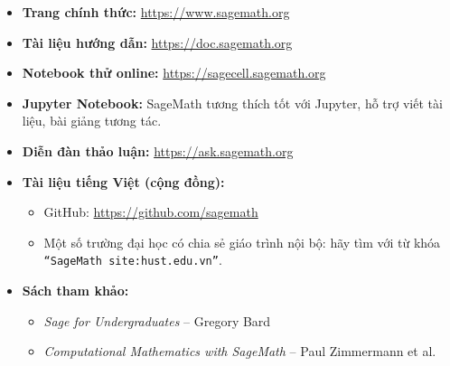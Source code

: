 \begin{itemize}
	\item \textbf{Trang chính thức:} \url{https://www.sagemath.org}
	\item \textbf{Tài liệu hướng dẫn:} \url{https://doc.sagemath.org}
	\item \textbf{Notebook thử online:} \url{https://sagecell.sagemath.org}
	\item \textbf{Jupyter Notebook:} SageMath tương thích tốt với Jupyter, hỗ trợ viết tài liệu, bài giảng tương tác.
	\item \textbf{Diễn đàn thảo luận:} \url{https://ask.sagemath.org}
	\item \textbf{Tài liệu tiếng Việt (cộng đồng):}
	\begin{itemize}
		\item GitHub: \url{https://github.com/sagemath}
		\item Một số trường đại học có chia sẻ giáo trình nội bộ: hãy tìm với từ khóa \texttt{“SageMath site:hust.edu.vn”}.
	\end{itemize}
	\item \textbf{Sách tham khảo:}
	\begin{itemize}
		\item \textit{Sage for Undergraduates} – Gregory Bard
		\item \textit{Computational Mathematics with SageMath} – Paul Zimmermann et al.
	\end{itemize}
\end{itemize}
